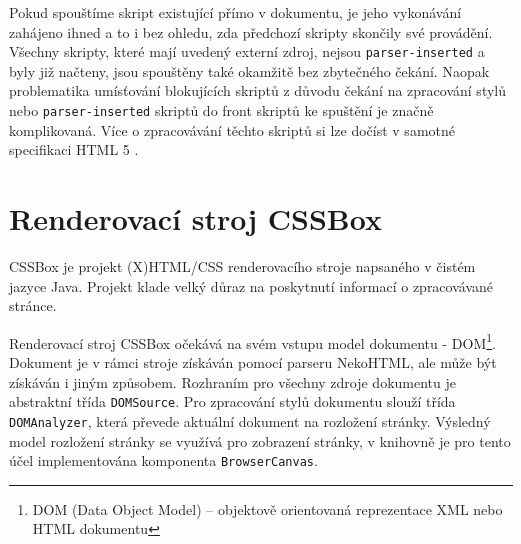 Pokud spouštíme skript existující přímo v dokumentu, je jeho vykonávání zahájeno ihned a to i bez ohledu, zda předchozí skripty skončily své provádění. Všechny skripty, které mají uvedený externí zdroj, nejsou \texttt{parser-inserted} a byly již načteny, jsou spouštěny také okamžitě bez zbytečného čekání. Naopak problematika umísťování blokujících skriptů z důvodu čekání na zpracování stylů nebo \texttt{parser-inserted} skriptů do front skriptů ke spuštění je značně komplikovaná. Více o zpracovávání těchto skriptů si lze dočíst v samotné specifikaci HTML 5 \cite{Bibliography.HTML5.Scripting}.

\section{Renderovací stroj CSSBox}
\label{Chapter.DependenciesAnalysis.CSSBox}

CSSBox je projekt (X)HTML/CSS renderovacího stroje napsaného v čistém jazyce Java. Projekt klade velký důraz na poskytnutí informací o zpracovávané stránce.

Renderovací stroj CSSBox očekává na svém vstupu model dokumentu - DOM\footnote{DOM (Data Object Model) -- objektově orientovaná reprezentace XML nebo HTML dokumentu}. Dokument je v rámci stroje získáván pomocí parseru NekoHTML, ale může být získáván i jiným způsobem. Rozhraním pro všechny zdroje dokumentu je abstraktní třída \texttt{DOMSource}. Pro zpracování stylů dokumentu slouží třída \texttt{DOMAnalyzer}, která převede aktuální dokument na rozložení stránky. Výsledný model rozložení stránky se využívá pro zobrazení stránky, v knihovně je pro tento účel implementována komponenta \texttt{BrowserCanvas}.

